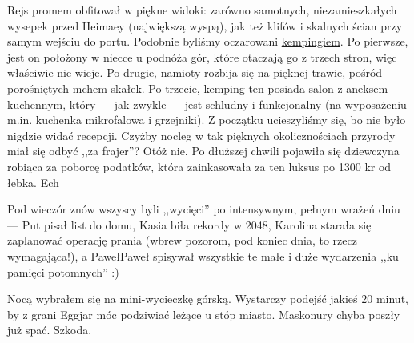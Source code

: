 
Rejs promem obfitował w piękne widoki: zarówno samotnych, niezamieszkałych wysepek przed Heimaey (największą wyspą), jak też klifów i skalnych ścian przy samym wejściu do portu. Podobnie byliśmy oczarowani \href{http://www.tjalda.is/en/herjolfsdalur/}{kempingiem}. Po pierwsze, jest on położony w niecce u podnóża gór, które otaczają go z trzech stron, więc właściwie nie wieje. Po drugie, namioty rozbija się na pięknej trawie, pośród porośniętych mchem skałek. Po trzecie, kemping ten posiada salon z aneksem kuchennym, który --- jak zwykle --- jest schludny i funkcjonalny (na wyposażeniu m.in. kuchenka mikrofalowa i grzejniki). Z początku ucieszyliśmy się, bo nie było nigdzie widać recepcji. Czyżby nocleg w tak pięknych okolicznościach przyrody miał się odbyć ,,za frajer''? Otóż nie. Po dłuższej chwili pojawiła się dziewczyna robiąca za poborcę podatków, która zainkasowała za ten luksus po 1300 kr od łebka. Ech\textellipsis


Pod wieczór znów wszyscy byli ,,wycięci'' po intensywnym, pełnym wrażeń dniu --- Put pisał list do domu, Kasia biła rekordy w 2048, Karolina starała się zaplanować operację prania (wbrew pozorom, pod koniec dnia, to rzecz wymagająca!), a Paweł\textellipsis Paweł spisywał wszystkie te małe i duże wydarzenia ,,ku pamięci potomnych'' :)

Nocą wybrałem się na mini-wycieczkę górską. Wystarczy podejść jakieś 20 minut, by z grani Eggjar móc podziwiać leżące u stóp miasto. Maskonury chyba poszły już spać. Szkoda.
